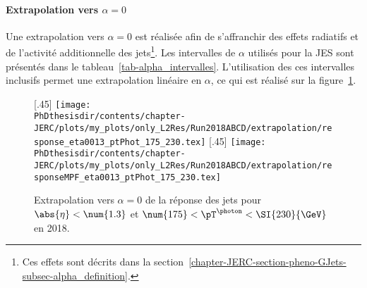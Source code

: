 \paragraph{Extrapolation vers $\alpha=0$}
Une extrapolation vers $\alpha=0$ est réalisée afin de s'affranchir des effets radiatifs et de l'activité additionnelle des jets\footnote{Ces effets sont décrits dans la section~\ref{chapter-JERC-section-pheno-GJets-subsec-alpha_definition}.}.
Les intervalles de $\alpha$ utilisés pour la JES sont présentés dans le tableau~\ref{tab-alpha_intervalles}.
L'utilisation des ces intervalles inclusifs permet une extrapolation linéaire en $\alpha$, ce qui est réalisé sur la figure~\ref{fig-chapter-JERC-section-JES-subsec-analyse-responsebal_and_MPF_eta0013_ptPhot_175_230_extrap}.
\begin{figure}[h]
\centering
{}[.45\textwidth]
{\texttt{[image: \\PhDthesisdir/contents/chapter-JERC/plots/my\_plots/only\_L2Res/Run2018ABCD/extrapolation/response\_eta0013\_ptPhot\_175\_230.tex]}}
\hfill
{}[.45\textwidth]
{\texttt{[image: \\PhDthesisdir/contents/chapter-JERC/plots/my\_plots/only\_L2Res/Run2018ABCD/extrapolation/responseMPF\_eta0013\_ptPhot\_175\_230.tex]}}
\caption[Extrapolation vers $\alpha=0$ de la réponse des jets.]{Extrapolation vers $\alpha=0$ de la réponse des jets pour $\abs{\eta}<\num{1.3}$ et $\num{175}<\pT^{\photon}<\SI{230}{\GeV}$ en 2018.}
\label{fig-chapter-JERC-section-JES-subsec-analyse-responsebal_and_MPF_eta0013_ptPhot_175_230_extrap}
\end{figure}
